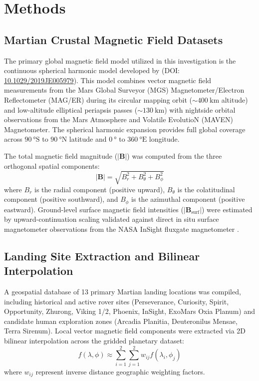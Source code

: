\section{Methods}
\label{sec:methods}

\subsection{Martian Crustal Magnetic Field Datasets}
The primary global magnetic field model utilized in this investigation is the continuous spherical harmonic model developed by \citet{Langlais2019} (DOI: \href{https://doi.org/10.1029/2019JE005979}{10.1029/2019JE005979}). This model combines vector magnetic field measurements from the Mars Global Surveyor (MGS) Magnetometer/Electron Reflectometer (MAG/ER) during its circular mapping orbit ($\sim\SI{400}{\kilo\meter}$ altitude) and low-altitude elliptical periapsis passes ($\sim\SI{130}{\kilo\meter}$) with nightside orbital observations from the Mars Atmosphere and Volatile EvolutioN (MAVEN) Magnetometer. The spherical harmonic expansion provides full global coverage across $\SI{90}{\degree}\text{S}$ to $\SI{90}{\degree}\text{N}$ latitude and $\SI{0}{\degree}$ to $\SI{360}{\degree}\text{E}$ longitude.

The total magnetic field magnitude ($|\mathbf{B}|$) was computed from the three orthogonal spatial components:
\begin{equation}
|\mathbf{B}| = \sqrt{B_r^2 + B_\theta^2 + B_\phi^2}
\end{equation}
where $B_r$ is the radial component (positive upward), $B_\theta$ is the colatitudinal component (positive southward), and $B_\phi$ is the azimuthal component (positive eastward). Ground-level surface magnetic field intensities ($|\mathbf{B}_{\text{surf}}|$) were estimated by upward-continuation scaling validated against direct in situ surface magnetometer observations from the NASA InSight fluxgate magnetometer \citep{Johnson2020}.

\subsection{Landing Site Extraction and Bilinear Interpolation}
A geospatial database of 13 primary Martian landing locations was compiled, including historical and active rover sites (Perseverance, Curiosity, Spirit, Opportunity, Zhurong, Viking 1/2, Phoenix, InSight, ExoMars Oxia Planum) and candidate human exploration zones (Arcadia Planitia, Deuteronilus Mensae, Terra Sirenum). Local vector magnetic field components were extracted via 2D bilinear interpolation across the gridded planetary dataset:
\begin{equation}
f(\lambda, \phi) \approx \sum_{i=1}^2 \sum_{j=1}^2 w_{ij} f(\lambda_i, \phi_j)
\end{equation}
where $w_{ij}$ represent inverse distance geographic weighting factors.

